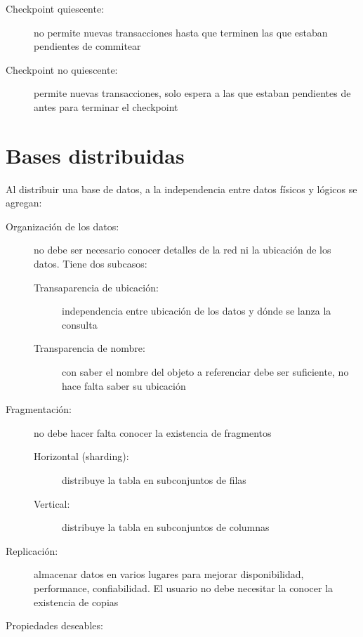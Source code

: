 \begin{description}
	\item[Checkpoint quiescente:] no permite nuevas transacciones hasta que terminen las que estaban pendientes de commitear
	\item[Checkpoint no quiescente:] permite nuevas transacciones, solo espera a las que estaban pendientes de antes para terminar el checkpoint
\end{description}

\section{Bases distribuidas}

Al distribuir una base de datos, a la independencia entre datos físicos y lógicos se agregan:

\begin{description}
	\item[Organización de los datos:] no debe ser necesario conocer detalles de la red ni la ubicación de los datos. Tiene dos subcasos:
	\begin{description}
		\item[Transaparencia de ubicación:] independencia entre ubicación de los datos y dónde se lanza la consulta
		\item[Transparencia de nombre:] con saber el nombre del objeto a referenciar debe ser suficiente, no hace falta saber su ubicación
	\end{description}
	\item[Fragmentación:] no debe hacer falta conocer la existencia de fragmentos
	\begin{description}
		\item[Horizontal (sharding):] distribuye la tabla en subconjuntos de filas
		\item[Vertical:] distribuye la tabla en subconjuntos de columnas
	\end{description}
	\item[Replicación:] almacenar datos en varios lugares para mejorar disponibilidad, performance, confiabilidad. El usuario no debe necesitar la conocer la existencia de copias
\end{description}

Propiedades deseables:

